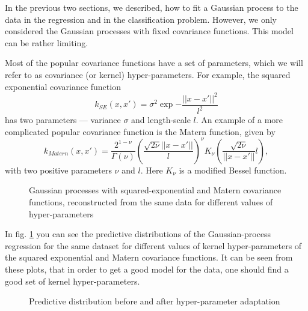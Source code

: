 In the previous two sections, we described, how to fit a Gaussian process to the data in the regression and in the classification problem. However, we only considered the Gaussian processes with fixed covariance functions. This model can be rather limiting.

Most of the popular covariance functions have a set of parameters, which we will refer to as covariance (or kernel) hyper-parameters. For example, the squared exponential covariance function
$$k_{SE}(x, x') = \sigma^2 \exp{ - \frac{||x - x'||^2}{l^2}}$$
has two parameters — variance $\sigma$ and length-scale $l$. An example of a more complicated popular covariance function is the Matern function, given by
$$k_{Matern}(x, x') = \frac{2^{1 - \nu}} {\Gamma(\nu)} \left(\frac{\sqrt{2 \nu}||x - x'||}{l}\right)^{\nu} K_{\nu} \left( \frac{\sqrt{2 \nu}}{||x - x'||}{l}\right),$$ 
with two positive parameters $\nu$ and $l$. Here $K_{\nu}$ is a modified Bessel function.

\begin{figure}[!h]
	\centering

	\subfloat{
		\scalebox{0.5}{
			
		}
	}
	\subfloat{
		\scalebox{0.5}{
			
		}
	}
	\subfloat{
		\scalebox{0.5}{
			
		}
	}

	\subfloat{
		\scalebox{0.5}{
			
		}
	}
	\subfloat{
		\scalebox{0.5}{
			
		}
	}
	\subfloat{
		\scalebox{0.5}{
			
		}
	}
	\caption{Gaussian processes with squared-exponential and Matern covariance functions, reconstructed from the same data for different values of hyper-parameters}
	\label{cov_examples}
\end{figure}

In fig. \ref{cov_examples} you can see the predictive distributions of the Gaussian-process regression for the same dataset for different values of kernel hyper-parameters of the squared exponential and Matern covariance functions. It can be seen from these plots, that in order to get a good model for the data, one should find a good set of kernel hyper-parameters.

\begin{figure}[!h]
	\centering
	\subfloat{
		\scalebox{0.75}{
			
		}
	}
	\subfloat{
		\scalebox{0.75}{
			
		}
	}
	\caption{Predictive distribution before and after hyper-parameter adaptation}
	\label{model_adaptation}
\end{figure}

